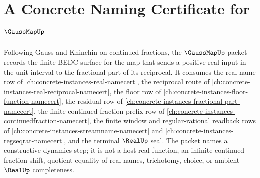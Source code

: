 \chapter{A Concrete Naming Certificate for $\GaussMapUp$}
\label{ch:concrete-instances-gauss-map-namecert}

Following Gauss and Khinchin on continued fractions, the $\GaussMapUp$ packet records the finite BEDC surface for the map that sends a positive real input in the unit interval to the fractional part of its reciprocal. It consumes the real-name row of \autoref{ch:concrete-instances-real-namecert}, the reciprocal route of \autoref{ch:concrete-instances-real-reciprocal-namecert}, the floor row of \autoref{ch:concrete-instances-floor-function-namecert}, the residual row of \autoref{ch:concrete-instances-fractional-part-namecert}, the finite continued-fraction prefix row of \autoref{ch:concrete-instances-continuedfraction-namecert}, the finite window and regular-rational readback rows of \autoref{ch:concrete-instances-streamname-namecert} and \autoref{ch:concrete-instances-regseqrat-namecert}, and the terminal $\RealUp$ seal. The packet names a constructive dynamics step; it is not a host real function, an infinite continued-fraction shift, quotient equality of real names, trichotomy, choice, or ambient $\RealUp$ completeness.

